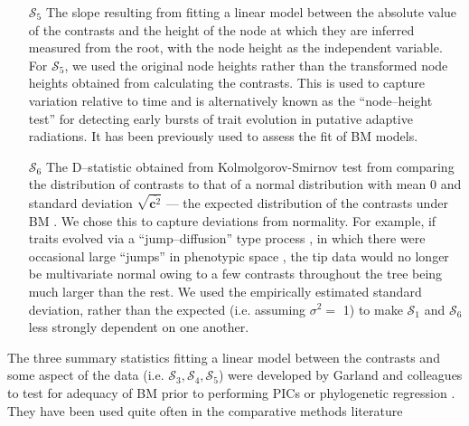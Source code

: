 \documentclass[a4paper,12pt]{article}
\begin{document}
\begin{enumerate}
\item[$\mathcal{S}_5$] The slope resulting from fitting a linear model between the absolute value of the contrasts and the height of the node at which they are inferred measured from the root, with the node height as the independent variable. For $\mathcal{S}_5$, we used the original node heights rather than the transformed node heights obtained from calculating the contrasts. This is used to capture variation relative to time and is alternatively known as the ``node--height test'' \citep{FreckletonHarvey2006} for detecting early bursts of trait evolution in putative adaptive radiations. It has been  previously used to assess the fit of BM models.

\item[$\mathcal{S}_6$] The D--statistic obtained from Kolmolgorov-Smirnov test from comparing the distribution of contrasts to that of a normal distribution with mean 0 and standard deviation $\sqrt{\overline{\mathbf{c}^2}}$ --- the expected distribution of the contrasts under BM \citep{Felsenstein1985, Rohlf2001}. We chose this to capture deviations from normality. For example, if traits evolved via a ``jump--diffusion'' type process \citep{Landis2012, Eastmanlevy}, in which there were occasional large ``jumps'' in phenotypic space \citep[see][]{PennellPE}, the tip data would no longer be multivariate normal owing to a few contrasts throughout the tree being much larger than the rest.  We used the empirically estimated standard deviation, rather than the expected (i.e. assuming $\sigma^2=$ 1) to make $\mathcal{S}_1$ and $\mathcal{S}_6$ less strongly dependent on one another.

\end{enumerate}

The three summary statistics fitting a linear model between the contrasts and some aspect of the data (i.e. $\mathcal{S}_3, \mathcal{S}_4, \mathcal{S}_5$) were developed by Garland and colleagues \citep{Garland1992, Garland1993,  Diaz1996} to test for adequacy of BM prior to performing PICs \citep{Felsenstein1985} or phylogenetic regression \citep{Grafen1989}. They have been used quite often in the comparative methods literature 
\end{document}
